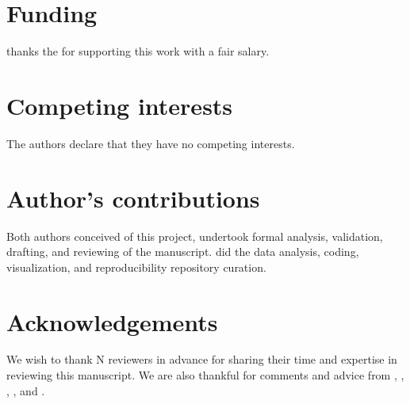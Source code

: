 \documentclass{bmcart}
\begin{document}

\begin{backmatter}

\section*{Funding}
   thanks the  for supporting this work with a fair salary. 
  
\section*{Competing interests}
  The authors declare that they have no competing interests.

\section*{Author's contributions}
  Both authors conceived of this project, undertook formal analysis, validation, drafting, and reviewing of the manuscript.  did the data analysis, coding, visualization, and reproducibility repository curation.

\section*{Acknowledgements}
  We wish to thank N reviewers in advance for sharing their time and expertise in reviewing this manuscript. We are also thankful for comments and advice from , , , , and .


\end{backmatter}
\end{document}
